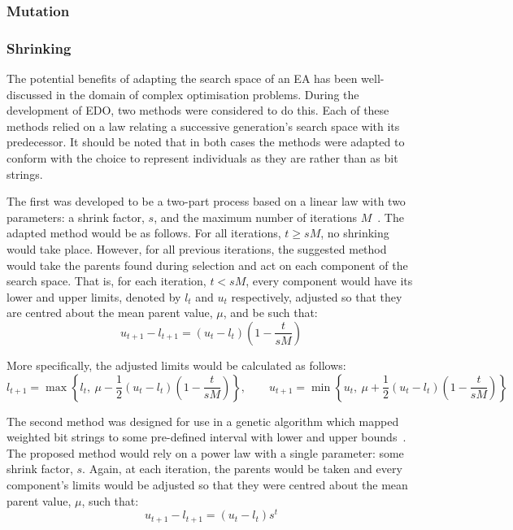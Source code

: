 

\subsubsection{Mutation}



\subsubsection{Shrinking}

The potential benefits of adapting the search space of an EA has been
well-discussed in the domain of complex optimisation problems. During the
development of EDO, two methods were considered to do this. Each of these
methods relied on a law relating a successive generation's search space with its
predecessor. It should be noted that in both cases the methods were adapted to
conform with the choice to represent individuals as they are rather than as bit
strings.

The first was developed to be a two-part process based on a linear law with two
parameters: a shrink factor, \(s\), and the maximum number of iterations
\(M\)~\cite{Amirjanov2017}. The adapted method would be as follows. For all
iterations, \(t \geq sM\), no shrinking would take place. However, for all
previous iterations, the suggested method would take the parents found during
selection and act on each component of the search space. That is, for each
iteration, \(t < sM\), every component would have its lower and upper limits,
denoted by \(l_t\) and \(u_t\) respectively, adjusted so that they are centred
about the mean parent value, \(\mu\), and be such that:
\[
    u_{t+1} - l_{t+1} = (u_t - l_t) \left(1 - \frac{t}{sM}\right)
\]

More specifically, the adjusted limits would be calculated as follows:
\[
    l_{t+1} = \max \left\{%
        l_t, \ \mu - \frac{1}{2} (u_t - l_t) \left(1 - \frac{t}{sM}\right)
    \right\},
    \qquad%
    u_{t+1} = \min \left\{%
        u_t, \ \mu + \frac{1}{2} (u_t - l_t) \left(1 - \frac{t}{sM}\right)
    \right\}
\]

The second method was designed for use in a genetic algorithm which mapped
weighted bit strings to some pre-defined interval with lower and upper
bounds~\cite{Amirjanov2016}. The proposed method would rely on a power law with
a single parameter: some shrink factor, \(s\). Again, at each iteration, the
parents would be taken and every component's limits would be adjusted so that
they were centred about the mean parent value, \(\mu\), such that:
\[
    u_{t+1} - l_{t+1} = (u_t - l_t) s^t
\]

